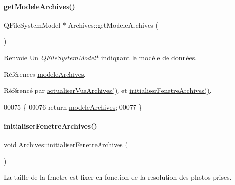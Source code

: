 \paragraph{\texorpdfstring{get\+Modele\+Archives()}{getModeleArchives()}}
{\footnotesize\ttfamily Q\+File\+System\+Model $\ast$ Archives\+::get\+Modele\+Archives (\begin{DoxyParamCaption}{ }\end{DoxyParamCaption})}

\begin{DoxyReturn}{Renvoie}
Un {\itshape Q\+File\+System\+Model$\ast$} indiquant le modèle de données. 
\end{DoxyReturn}


Références \hyperlink{class_archives_a61376e4ec330aea053fede230a1bc786}{modele\+Archives}.



Référencé par \hyperlink{class_archives_a380ac387d773b07ea5138347dbaca65a}{actualiser\+Vue\+Archives()}, et \hyperlink{class_archives_a1842ebad3721929949bc07be5144b79c}{initialiser\+Fenetre\+Archives()}.


\begin{DoxyCode}
00075 \{
00076     \textcolor{keywordflow}{return} \hyperlink{class_archives_a61376e4ec330aea053fede230a1bc786}{modeleArchives};
00077 \}
\end{DoxyCode}
\mbox{\label{class_archives_a1842ebad3721929949bc07be5144b79c}} 
\paragraph{\texorpdfstring{initialiser\+Fenetre\+Archives()}{initialiserFenetreArchives()}}
{\footnotesize\ttfamily void Archives\+::initialiser\+Fenetre\+Archives (\begin{DoxyParamCaption}{ }\end{DoxyParamCaption})\hspace{0.3cm}{\ttfamily [private]}}

La taille de la fenetre est fixer en fonction de la resolution des photos prises. 

